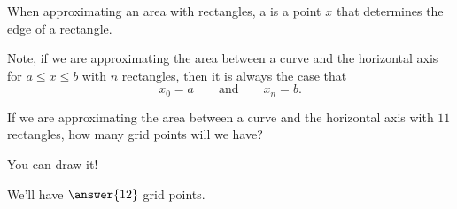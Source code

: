 \documentclass{ximera}
\begin{document}
\begin{definition}
  When approximating an area with rectangles, a  is a
  point $x$ that determines the edge of a rectangle.
\begin{image}
\end{image}
Note, if we are approximating the area between a curve and the
horizontal axis for $a\le x\le b$ with $n$ rectangles, then it is
always the case that
\[
x_0=a\qquad\text{and}\qquad x_n = b.
\]
\end{definition}

\begin{question}
  If we are approximating the area between a curve and the horizontal
  axis with $11$ rectangles, how many grid points will we have?
  \begin{hint}
    You can draw it!
  \end{hint}
  \begin{prompt}
    We'll have $\answer{12}$ grid points.
  \end{prompt}
\end{question}
\end{document}

